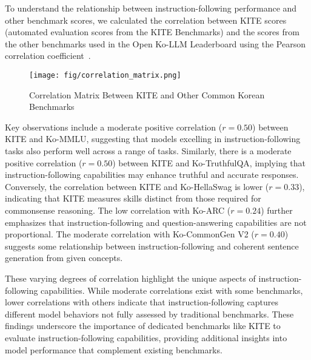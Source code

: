     To understand the relationship between instruction-following performance and other benchmark scores, we calculated the correlation between KITE scores (automated evaluation scores from the KITE Benchmarks) and the scores from the other benchmarks used in the Open Ko-LLM Leaderboard using the Pearson correlation coefficient~\cite{benesty2009pearson}.

    \begin{figure}[t]
        \centering
        \texttt{[image: fig/correlation\_matrix.png]}
        \caption{Correlation Matrix Between KITE and Other Common Korean Benchmarks}
        \label{fig:correlation_matrix}
    \end{figure}

    Key observations include a moderate positive correlation (\( r = 0.50 \))  between KITE and Ko-MMLU, suggesting that models excelling in instruction-following tasks also perform well across a range of tasks. Similarly, there is a moderate positive correlation (\( r = 0.50 \)) between KITE and Ko-TruthfulQA, implying that instruction-following capabilities may enhance truthful and accurate responses. Conversely, the correlation between KITE and Ko-HellaSwag is lower (\( r = 0.33 \)), indicating that KITE measures skills distinct from those required for commonsense reasoning. The low correlation with Ko-ARC (\( r = 0.24 \)) further emphasizes that instruction-following and question-answering capabilities are not proportional. The moderate correlation with Ko-CommonGen V2  (\( r = 0.40 \)) suggests some relationship between instruction-following and coherent sentence generation from given concepts.

    These varying degrees of correlation highlight the unique aspects of instruction-following capabilities. While moderate correlations exist with some benchmarks, lower correlations with others indicate that instruction-following captures different model behaviors not fully assessed by traditional benchmarks. These findings underscore the importance of dedicated benchmarks like KITE to evaluate instruction-following capabilities, providing additional insights into model performance that complement existing benchmarks.

